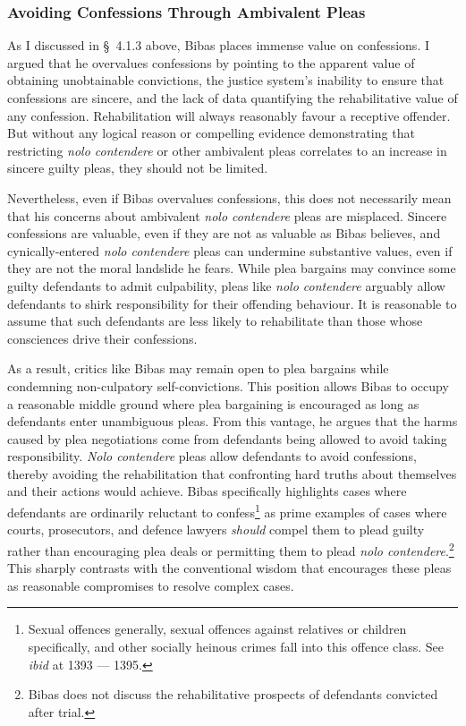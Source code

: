 \subsubsection{Avoiding Confessions Through Ambivalent Pleas}

As I discussed in § 4.1.3 above, Bibas places immense value on confessions. I argued that he overvalues confessions by pointing to the apparent value of obtaining unobtainable convictions, the justice system's inability to ensure that confessions are sincere, and the lack of data quantifying the rehabilitative value of any confession. Rehabilitation will always reasonably favour a receptive offender. But without any logical reason or compelling evidence demonstrating that restricting \textit{nolo contendere} or other ambivalent pleas correlates to an increase in sincere guilty pleas, they should not be limited.

Nevertheless, even if Bibas overvalues confessions, this does not necessarily mean that his concerns about ambivalent \textit{nolo contendere} pleas are misplaced. Sincere confessions are valuable, even if they are not as valuable as Bibas believes, and cynically-entered \textit{nolo contendere} pleas can undermine substantive values, even if they are not the moral landslide he fears. While plea bargains may convince some guilty defendants to admit culpability, pleas like \textit{nolo contendere} arguably allow defendants to shirk responsibility for their offending behaviour. It is reasonable to assume that such defendants are less likely to rehabilitate than those whose consciences drive their confessions.

As a result, critics like Bibas may remain open to plea bargains while condemning non-culpatory self-convictions. This position allows Bibas to occupy a reasonable middle ground where plea bargaining is encouraged as long as defendants enter unambiguous pleas. From this vantage, he argues that the harms caused by plea negotiations come from defendants being allowed to avoid taking responsibility. \textit{Nolo contendere} pleas allow defendants to avoid confessions, thereby avoiding the rehabilitation that confronting hard truths about themselves and their actions would achieve. Bibas specifically highlights cases where defendants are ordinarily reluctant to confess\footnote{Sexual offences generally, sexual offences against relatives or children specifically, and other socially heinous crimes fall into this offence class. See \textit{ibid} at 1393 — 1395.} as prime examples of cases where courts, prosecutors, and defence lawyers \textit{should} compel them to plead guilty rather than encouraging plea deals or permitting them to plead \textit{nolo contendere}.\footnote{Bibas does not discuss the rehabilitative prospects of defendants convicted after trial.} This sharply contrasts with the conventional wisdom that encourages these pleas as reasonable compromises to resolve complex cases.

